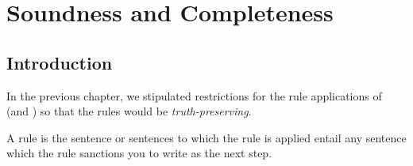 
\chapter{Soundness and Completeness}\label{completenesschapter}

\section{Introduction}

In the previous chapter, we stipulated restrictions for the rule applications of \GSD{} (and \GQD{}) so that the rules would be \emph{truth-preserving}.

\begin{majorILnc}{}
	A rule is  \Iff the sentence or sentences to which the rule is applied entail any sentence which the rule  sanctions you to write as the next step. 
\end{majorILnc}


